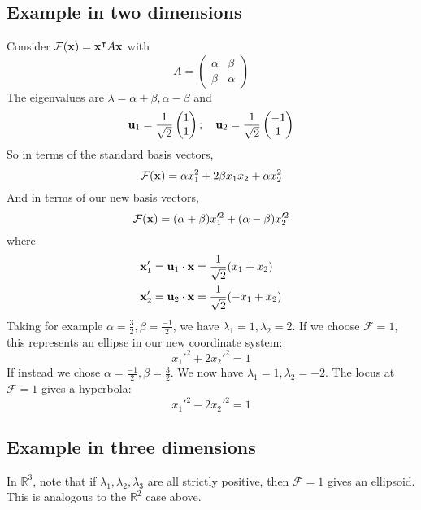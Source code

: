 \subsection{Example in two dimensions}
Consider \(\mathcal F(\vb x) = \vb x^\intercal A \vb x\) with
\[
	A = \begin{pmatrix}
		\alpha & \beta \\ \beta & \alpha
	\end{pmatrix}
\]
The eigenvalues are \(\lambda = \alpha + \beta, \alpha - \beta\) and
\[
	\vb u_1 = \frac{1}{\sqrt 2}\begin{pmatrix}
		1 \\ 1
	\end{pmatrix};\quad \vb u_2 = \frac{1}{\sqrt 2}\begin{pmatrix}
		-1 \\ 1
	\end{pmatrix}
\]
So in terms of the standard basis vectors,
\[
	\mathcal F(\vb x) = \alpha x_1^2 + 2\beta x_1x_2 + \alpha x_2^2
\]
And in terms of our new basis vectors,
\[
	\mathcal F(\vb x) = (\alpha + \beta) x_1'^2 + (\alpha - \beta) x_2'^2
\]
where
\begin{align*}
	\vb x_1' & = \vb u_1 \cdot \vb x = \frac{1}{\sqrt 2}(x_1 + x_2)  \\
	\vb x_2' & = \vb u_2 \cdot \vb x = \frac{1}{\sqrt 2}(-x_1 + x_2) \\
\end{align*}
Taking for example \(\alpha = \frac{3}{2}, \beta = \frac{-1}{2}\), we have \(\lambda_1 = 1, \lambda_2 = 2\).
If we choose \(\mathcal F = 1\), this represents an ellipse in our new coordinate system:
\[
	x_1'^2 + 2x_2'^2 = 1
\]
If instead we chose \(\alpha = \frac{-1}{2}, \beta = \frac{3}{2}\).
We now have \(\lambda_1 = 1, \lambda_2 = -2\).
The locus at \(\mathcal F = 1\) gives a hyperbola:
\[
	x_1'^2 - 2x_2'^2 = 1
\]

\subsection{Example in three dimensions}
In \(\mathbb R^3\), note that if \(\lambda_1, \lambda_2, \lambda_3\) are all strictly positive, then \(\mathcal F = 1\) gives an ellipsoid.
This is analogous to the \(\mathbb R^2\) case above.

